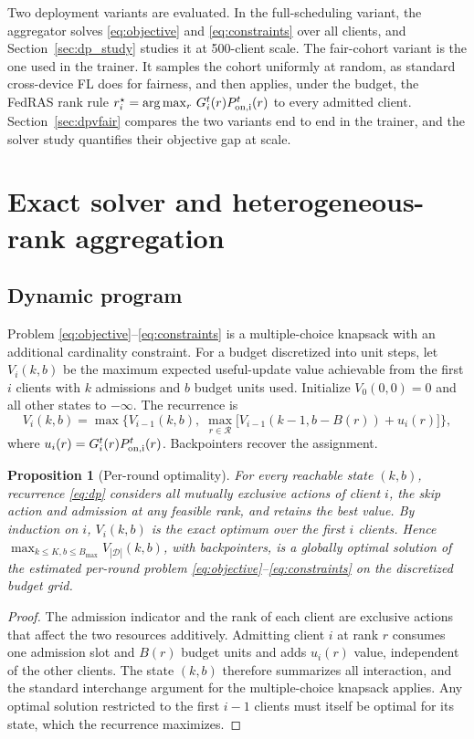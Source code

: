 \documentclass[preprint,12pt]{elsarticle}
\newtheorem{proposition}{Proposition}
\begin{document}
Two deployment variants are evaluated. In the full-scheduling variant, the aggregator solves \eqref{eq:objective} and \eqref{eq:constraints} over all clients, and Section~\ref{sec:dp_study} studies it at 500-client scale. The fair-cohort variant is the one used in the trainer. It samples the cohort uniformly at random, as standard cross-device FL does for fairness, and then applies, under the budget, the FedRAS rank rule $r_i^\star=\arg\max_r\, G_i^t(r)P_{\rm on,i}^t(r)$ to every admitted client. Section~\ref{sec:dpvfair} compares the two variants end to end in the trainer, and the solver study quantifies their objective gap at scale.

\section{Exact solver and heterogeneous-rank aggregation}
\label{sec:solver}

\subsection{Dynamic program}
Problem \eqref{eq:objective}--\eqref{eq:constraints} is a multiple-choice knapsack with an additional cardinality constraint. For a budget discretized into unit steps, let $V_i(k,b)$ be the maximum expected useful-update value achievable from the first $i$ clients with $k$ admissions and $b$ budget units used. Initialize $V_0(0,0)=0$ and all other states to $-\infty$. The recurrence is
\begin{equation}
V_i(k,b)=\max\Big\{V_{i-1}(k,b),\;\max_{r\in\mathcal R}\big[V_{i-1}(k-1,b-B(r))+u_i(r)\big]\Big\},
\label{eq:dp}
\end{equation}
where $u_i(r)=G_i^t(r)P_{\rm on,i}^t(r)$. Backpointers recover the assignment.

\begin{proposition}[Per-round optimality]
For every reachable state $(k,b)$, recurrence \eqref{eq:dp} considers all mutually exclusive actions of client $i$, the skip action and admission at any feasible rank, and retains the best value. By induction on $i$, $V_i(k,b)$ is the exact optimum over the first $i$ clients. Hence $\max_{k\le K,b\le B_{\max}}V_{|\mathcal D|}(k,b)$, with backpointers, is a globally optimal solution of the estimated per-round problem \eqref{eq:objective}--\eqref{eq:constraints} on the discretized budget grid.
\end{proposition}
\begin{proof}
The admission indicator and the rank of each client are exclusive actions that affect the two resources additively. Admitting client $i$ at rank $r$ consumes one admission slot and $B(r)$ budget units and adds $u_i(r)$ value, independent of the other clients. The state $(k,b)$ therefore summarizes all interaction, and the standard interchange argument for the multiple-choice knapsack applies. Any optimal solution restricted to the first $i-1$ clients must itself be optimal for its state, which the recurrence maximizes.
\end{proof}
\end{document}
